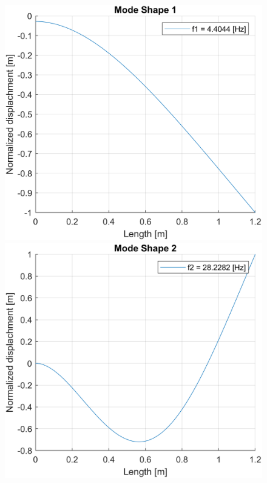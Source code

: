 \begin{figure}[H]
    \begin{minipage}[b]{0.45\textwidth}
        \centering
        \includegraphics[width=\textwidth]{img/MATLAB/Part_A/Mode_shapes/mode_shape_01.png}
    \end{minipage}
    \hfill
    \begin{minipage}[b]{0.45\textwidth}
        \centering
        \includegraphics[width=\textwidth]{img/MATLAB/Part_A/Mode_shapes/mode_shape_02.png}

\end{minipage}
\end{figure}
